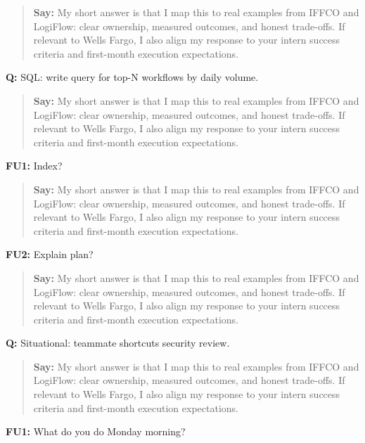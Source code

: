 \documentclass[9pt,a4paper]{article}
\begin{document}
\begin{quote}\small\textbf{Say:} My short answer is that I map this to real examples from IFFCO and LogiFlow: clear ownership, measured outcomes, and honest trade-offs. If relevant to Wells Fargo, I also align my response to your intern success criteria and first-month execution expectations.\end{quote}
\vspace{2mm}
\textbf{Q:} SQL: write query for top-N workflows by daily volume.

\begin{quote}\small\textbf{Say:} My short answer is that I map this to real examples from IFFCO and LogiFlow: clear ownership, measured outcomes, and honest trade-offs. If relevant to Wells Fargo, I also align my response to your intern success criteria and first-month execution expectations.\end{quote}
\vspace{2mm}
\textbf{FU1:} Index?

\begin{quote}\small\textbf{Say:} My short answer is that I map this to real examples from IFFCO and LogiFlow: clear ownership, measured outcomes, and honest trade-offs. If relevant to Wells Fargo, I also align my response to your intern success criteria and first-month execution expectations.\end{quote}
\vspace{2mm}
\textbf{FU2:} Explain plan?

\begin{quote}\small\textbf{Say:} My short answer is that I map this to real examples from IFFCO and LogiFlow: clear ownership, measured outcomes, and honest trade-offs. If relevant to Wells Fargo, I also align my response to your intern success criteria and first-month execution expectations.\end{quote}
\vspace{2mm}
\textbf{Q:} Situational: teammate shortcuts security review.

\begin{quote}\small\textbf{Say:} My short answer is that I map this to real examples from IFFCO and LogiFlow: clear ownership, measured outcomes, and honest trade-offs. If relevant to Wells Fargo, I also align my response to your intern success criteria and first-month execution expectations.\end{quote}
\vspace{2mm}
\textbf{FU1:} What do you do Monday morning?
\end{document}
